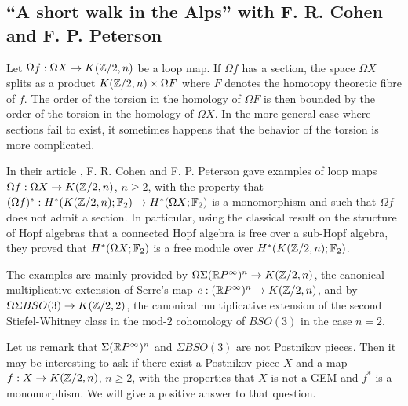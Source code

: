 \subsection*{``A short walk in the Alps'' with F. R. Cohen and F. P. Peterson}

Let $\Omega f:\Omega X\to K(\mathbb{Z}/2,n)$ be a loop map. If $\Omega f$ has a section, the space $\Omega X$ splits as a product $K(\mathbb{Z}/2,n)\times \Omega F$ where $F$ denotes the homotopy theoretic fibre of $f$. The order of the torsion in the homology of $\Omega F$ is then bounded by the order of the torsion in the homology of $\Omega X$. In the more general case where sections fail to exist, it sometimes happens that the behavior of the torsion is more complicated.

In their article \cite{CP00}, F. R. Cohen and F. P. Peterson gave examples of loop maps $\Omega f:\Omega X\to K(\mathbb{Z}/2,n)$, $n\geq2$, with the property that $(\Omega f)^*:H^*(K(\mathbb{Z}/2,n);\mathbb{F}_2)\to H^*(\Omega X;\mathbb{F}_2)$ is a monomorphism and such that $\Omega f$ does not admit a section. In particular, using the classical result on the structure of Hopf algebras that a connected Hopf algebra is free over a sub-Hopf algebra, they proved that $H^*(\Omega X;\mathbb{F}_2)$ is a free module over $H^*(K(\mathbb{Z}/2,n);\mathbb{F}_2)$. 

The examples are mainly provided by $\Omega\Sigma(\mathbb{R} P^\infty)^n\to K(\mathbb{Z}/2,n)$, the canonical multiplicative extension of Serre's map $e:(\mathbb{R} P^\infty)^n\to K(\mathbb{Z}/2,n)$, and by $\Omega\Sigma BSO(3)\to K(\mathbb{Z}/2,2)$, the canonical multiplicative extension of the second Stiefel-Whitney class in the mod-$2$ cohomology of $BSO(3)$ in the case $n=2$.

Let us remark that $\Sigma(\mathbb{R} P^\infty)^n$ and $\Sigma BSO(3)$ are not Postnikov pieces. Then it may be interesting to ask if there exist a Postnikov piece $X$ and a map $f:X\to K(\mathbb{Z}/2,n)$, $n\geq2$, with the properties that $X$ is not a GEM and $f^*$ is a monomorphism. We will give a positive answer to that question.

\endinput